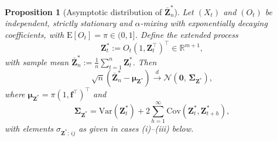 ﻿\documentclass[12pt,a4paper]{scrreprt}
\newtheorem{proposition}[theorem]{Proposition}
\theoremstyle{definition}
\begin{document}
\begin{proposition}[Asymptotic distribution of $\bar{\boldsymbol{Z}}^*_n$]
\label{prop:clt_zstar}
Let $(X_t)$ and $(O_t)$ be independent, strictly stationary and $\alpha$-mixing 
with exponentially decaying coefficients, with $\mathrm{E}[O_t] = \pi \in (0,1]$. 
Define the extended process
\[
    \boldsymbol{Z}^*_t := O_t(1, \boldsymbol{Z}_t^\top)^\top \in \mathbb{R}^{m+1},
\]
with sample mean $\bar{\boldsymbol{Z}}^*_n := \frac{1}{n}\sum_{t=1}^{n} 
\boldsymbol{Z}^*_t$. Then
\[
    \sqrt{n}\!\left(\bar{\boldsymbol{Z}}^*_n 
    - \boldsymbol{\mu}_{\boldsymbol{Z}^*}\right) 
    \xrightarrow{d} \mathcal{N}\!\left(\boldsymbol{0},\, 
    \boldsymbol{\Sigma}_{\boldsymbol{Z}^*}\right),
\]
where $\boldsymbol{\mu}_{\boldsymbol{Z}^*} = \pi(1, \boldsymbol{f}^\top)^\top$ 
and 
\[
    \boldsymbol{\Sigma}_{\boldsymbol{Z}^*} = \mathrm{Var}(\boldsymbol{Z}^*_t) 
    + 2\sum_{h=1}^{\infty}\mathrm{Cov}(\boldsymbol{Z}^*_t, \boldsymbol{Z}^*_{t+h}),
\]
with elements $\sigma_{\boldsymbol{Z}^*;\,ij}$ as given in 
cases \textnormal{(i)--(iii)} below.
\end{proposition}
\end{document}
